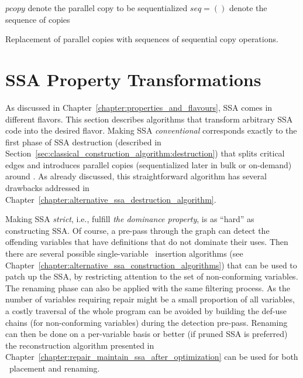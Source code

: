 {\begin{algorithm}[h]
    \Let $\textit{pcopy}$ denote the parallel copy to be sequentialized\;
    \Let $\textit{seq}=()$ denote the sequence of copies\;
\caption{\label{alg:ssadestruction:sequentialization}Replacement of
  parallel copies with sequences of sequential copy operations.}
\end{algorithm}



\section{SSA Property Transformations}
\label{section:classical_construction_algorithm:turning}
As discussed in Chapter~\ref{chapter:properties_and_flavours},
SSA comes in different flavors. 
This section describes algorithms that transform
arbitrary SSA code
into the desired flavor.
%
Making SSA \emph{conventional} corresponds exactly to the first phase of SSA destruction (described in Section~\ref{sec:classical_construction_algorithm:destruction}) that splits critical edges and introduces parallel copies (sequentialized later in bulk or on-demand) around \phifuns. As already discussed, this straightforward algorithm has several drawbacks addressed in Chapter~\ref{chapter:alternative_ssa_destruction_algorithm}.

Making SSA \emph{strict}, i.e., fulfill \emph{the dominance property}, is as ``hard'' as constructing SSA. Of course, a pre-pass through the graph can detect the offending variables that have definitions that do not dominate their uses. Then there are several possible single-variable \phifun\ insertion algorithms (see Chapter~\ref{chapter:alternative_ssa_construction_algorithms}) that can be used to patch up the SSA, by restricting attention to the set of non-conforming variables. The renaming phase can also be applied with the same filtering process. As the number of variables requiring repair might be a small proportion of all variables, a costly traversal of the whole program can be avoided by building the def-use chains (for non-conforming variables) during the detection pre-pass. Renaming can then be done on a per-variable basis or better (if pruned SSA is preferred) the reconstruction algorithm presented in Chapter~\ref{chapter:repair_maintain_ssa_after_optimization} can be used for both \phifuns\ placement and renaming.


}
